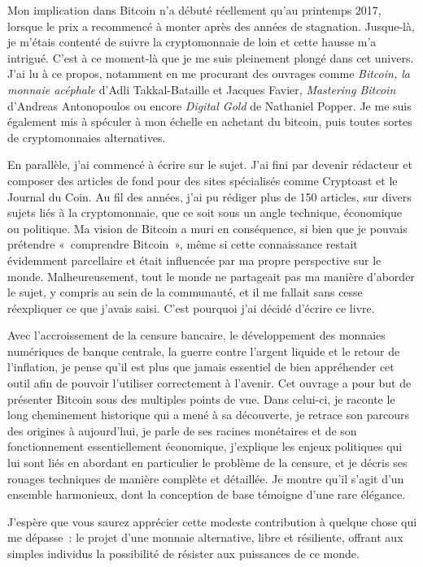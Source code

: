 Mon implication dans Bitcoin n'a débuté réellement qu'au printemps 2017, lorsque le prix a recommencé à monter après des années de stagnation. Jusque-là, je m'étais contenté de suivre la cryptomonnaie de loin et cette hausse m'a intrigué. C'est à ce moment-là que je me suis pleinement plongé dans cet univers. J'ai lu à ce propos, notamment en me procurant des ouvrages comme \emph{Bitcoin, la monnaie acéphale} d'Adli Takkal-Bataille et Jacques Favier, \emph{Mastering Bitcoin} d'Andreas Antonopoulos ou encore \emph{Digital Gold} de Nathaniel Popper. Je me suis également mis à spéculer à mon échelle en achetant du bitcoin, puis toutes sortes de cryptomonnaies alternatives.

En parallèle, j'ai commencé à écrire sur le sujet. J'ai fini par devenir rédacteur et composer des articles de fond pour des sites spécialisés comme Cryptoast et le Journal du Coin. Au fil des années, j'ai pu rédiger plus de 150 articles, sur divers sujets liés à la cryptomonnaie, que ce soit sous un angle technique, économique ou politique. Ma vision de Bitcoin a muri en conséquence, si bien que je pouvais prétendre «~comprendre Bitcoin~», même si cette connaissance restait évidemment parcellaire et était influencée par ma propre perspective sur le monde. Malheureusement, tout le monde ne partageait pas ma manière d'aborder le sujet, y compris au sein de la communauté, et il me fallait sans cesse réexpliquer ce que j'avais saisi. C'est pourquoi j'ai décidé d'écrire ce livre.

Avec l'accroissement de la censure bancaire, le développement des monnaies numériques de banque centrale, la guerre contre l'argent liquide et le retour de l'inflation, je pense qu'il est plus que jamais essentiel de bien appréhender cet outil afin de pouvoir l'utiliser correctement à l'avenir. Cet ouvrage a pour but de présenter Bitcoin sous des multiples points de vue. Dans celui-ci, je raconte le long cheminement historique qui a mené à sa découverte, je retrace son parcours des origines à aujourd'hui, je parle de ses racines monétaires et de son fonctionnement essentiellement économique, j'explique les enjeux politiques qui lui sont liés en abordant en particulier le problème de la censure, et je décris ses rouages techniques de manière complète et détaillée. Je montre qu'il s'agit d'un ensemble harmonieux, dont la conception de base témoigne d'une rare élégance.

J'espère que vous saurez apprécier cette modeste contribution à quelque chose qui me dépasse~: le projet d'une monnaie alternative, libre et résiliente, offrant aux simples individus la possibilité de résister aux puissances de ce monde.

